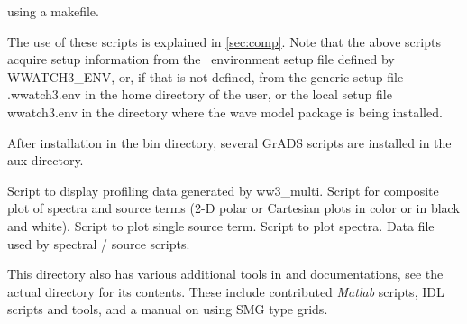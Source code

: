 \begin{flist}
{                        using a makefile.}
\end{flist}


The use of these scripts is explained in \para\ref{sec:comp}.  Note that the
above scripts acquire setup information from the \ws\ environment setup file
defined by {\code WWATCH3\_ENV}, or, if that is not defined, from the generic 
setup file {\file .wwatch3.env} in the home directory of the user, or the local 
setup file {\file wwatch3.env} in the directory where the wave model package is 
being installed.


After installation in the {\dir bin} directory, several GrADS scripts are
installed in the {\dir aux} directory.

\begin{flist}
      {Script to display profiling data generated by {\file
                       ww3\_multi}.} 
       {Script for composite plot of spectra and source
                       terms (2-D polar or Cartesian plots in color or in
                       black and white).}
      {Script to plot single source term.}
         {Script to plot spectra.}
   {Data file used by spectral / source scripts.}
\end{flist}


This directory also has various additional tools in and documentations, see
the actual directory for its contents. These include contributed {\it Matlab} scripts,
{\file IDL} scripts and tools, and a manual on using {\file SMG type} grids.


